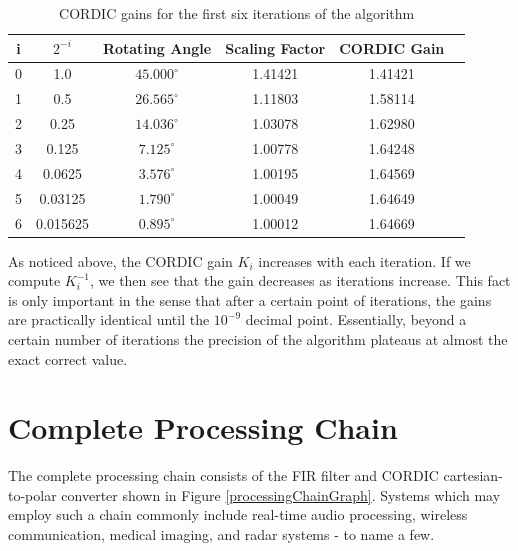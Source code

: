 \documentclass[11pt]{report}
\begin{document}
\begin{table}
\begin{center}
\begin{tabular}{|c|c|c|c|c|c|}
\hline
i & $2^{-i}$ 	& Rotating Angle  	& Scaling Factor 	& CORDIC Gain 	\\ \hline \hline
0 & 1.0 		& $45.000^{\circ}$	& 1.41421			& 1.41421		\\ \hline
1 & 0.5 		& $26.565^{\circ}$	& 1.11803			& 1.58114		\\ \hline
2 & 0.25 		& $14.036^{\circ}$	& 1.03078			& 1.62980		\\ \hline
3 & 0.125 		& $7.125^{\circ}$	& 1.00778			& 1.64248		\\ \hline
4 & 0.0625 	& $3.576^{\circ}$	& 1.00195			& 1.64569		\\ \hline
5 & 0.03125 	& $1.790^{\circ}$	& 1.00049			& 1.64649		\\ \hline
6 & 0.015625 	& $0.895^{\circ}$	& 1.00012			& 1.64669		\\ \hline
\end{tabular}
\end{center}
\caption{CORDIC gains for the first six iterations of the algorithm}
\label{table:cordic}
\end{table}
\FloatBarrier

As noticed above, the CORDIC gain $K_i$ increases with each iteration. If we compute $K_i ^{-1}$, we then see that the gain decreases as iterations increase. This fact is only important in the sense that after a certain point of iterations, the gains are practically identical until the $10^{-9}$ decimal point. Essentially, beyond a certain number of iterations the precision of the algorithm plateaus at almost the exact correct value.









\chapter{Complete Processing Chain}

The complete processing chain consists of the FIR filter and CORDIC cartesian-to-polar converter shown in Figure \ref{processingChainGraph}. Systems which may employ such a chain commonly include real-time audio processing, wireless communication, medical imaging, and radar systems - to name a few.  
\end{document}
